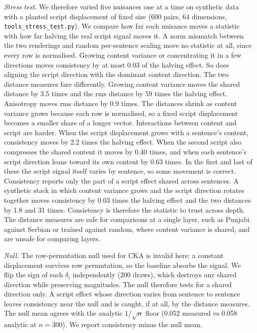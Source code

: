 \emph{Stress test.} We therefore varied five nuisances one at a time on
synthetic data with a planted script displacement of fixed size (600
pairs, 64 dimensions, \texttt{tools\_stress\_test.py}). We compare how
far each nuisance moves a statistic with how far halving the real script
signal moves it. A norm mismatch between the two renderings and random
per-sentence scaling move no statistic at all, since every row is
normalised. Growing content variance or concentrating it in a few
directions moves consistency by at most 0.03 of the halving effect. So
does aligning the script direction with the dominant content direction.
The two distance measures fare differently. Growing content variance
moves the shared distance by 3.5 times and the rms distance by 59 times
the halving effect. Anisotropy moves rms distance by 0.9 times. The
distances shrink as content variance grows because each row is
normalised, so a fixed script displacement becomes a smaller share of a
longer vector. Interactions between content and script are harder. When
the script displacement grows with a sentence's content, consistency
moves by 2.2 times the halving effect. When the second script also
compresses the shared content it moves by 0.40 times, and when each
sentence's script direction leans toward its own content by 0.63 times.
In the first and last of these the script signal itself varies by
sentence, so some movement is correct. Consistency reports only the part
of a script effect shared across sentences. A synthetic stack in which
content variance grows and the script direction rotates together moves
consistency by 0.03 times the halving effect and the two distances by
1.8 and 31 times. Consistency is therefore the statistic to trust across
depth. The distance measures are safe for comparisons at a single layer,
such as Punjabi against Serbian or trained against random, where content
variance is shared, and are unsafe for comparing layers.

\emph{Null.} The row-permutation null used for CKA is invalid here: a
constant displacement survives row permutation, so the baseline absorbs
the signal. We flip the sign of each \(\delta_i\) independently (200
draws), which destroys any shared direction while preserving magnitudes.
The null therefore tests for a shared direction only. A script effect
whose direction varies from sentence to sentence leaves consistency near
the null and is caught, if at all, by the distance measures. The null
mean agrees with the analytic \(1/\sqrt{n}\) floor (0.052 measured vs
0.058 analytic at \(n = 300\)). We report consistency minus the null
mean.

